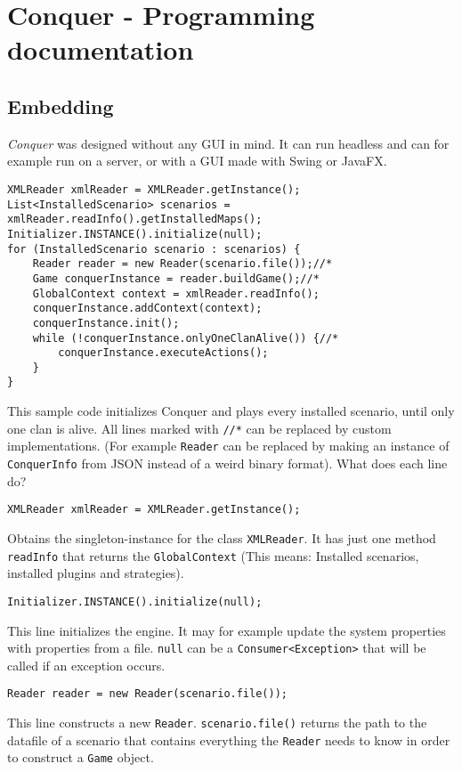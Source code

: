 \documentclass{article}
\begin{document}
\section{Conquer - Programming documentation}
\subsection{Embedding}
\textit{Conquer} was designed without any GUI in mind. It can run headless and can for example run on a server, or with a GUI made with Swing or JavaFX.
\begin{verbatim}
XMLReader xmlReader = XMLReader.getInstance();
List<InstalledScenario> scenarios = xmlReader.readInfo().getInstalledMaps();
Initializer.INSTANCE().initialize(null);
for (InstalledScenario scenario : scenarios) {
	Reader reader = new Reader(scenario.file());//*
	Game conquerInstance = reader.buildGame();//*
	GlobalContext context = xmlReader.readInfo();
	conquerInstance.addContext(context);
	conquerInstance.init();
	while (!conquerInstance.onlyOneClanAlive()) {//*
		conquerInstance.executeActions();
	}
}
\end{verbatim}
This sample code initializes Conquer and plays every installed scenario, until only one clan is alive.\newline
All lines marked with \texttt{//*} can be replaced by custom implementations. (For example \texttt{Reader} can be replaced by making an instance of \texttt{ConquerInfo} from JSON instead of a weird
binary format).
What does each line do?\newline
\begin{verbatim}
XMLReader xmlReader = XMLReader.getInstance();
\end{verbatim}
Obtains the singleton-instance for the class \texttt{XMLReader}. It has just one method \texttt{readInfo} that returns the \texttt{GlobalContext} (This means: Installed scenarios,
installed plugins and strategies).
\begin{verbatim}
Initializer.INSTANCE().initialize(null);
\end{verbatim}
This line initializes the engine. It may for example update the system properties with properties from a file. \texttt{null} can be a \texttt{Consumer<Exception>} that will be called if an exception 
occurs.
\begin{verbatim}
Reader reader = new Reader(scenario.file());
\end{verbatim}
This line constructs a new \texttt{Reader}. \texttt{scenario.file()} returns the path to the datafile of a scenario that contains everything the \texttt{Reader} needs to know in order to construct a \texttt{Game} object.
\end{document}
